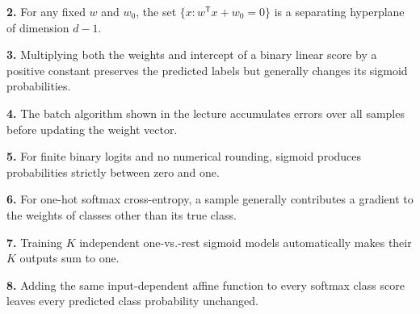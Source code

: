 \documentclass[11pt,a4paper]{article}
\begin{document}
\par\noindent\begin{minipage}{\linewidth}
\textbf{2.} For any fixed \(w\) and \(w_0\), the set \(\{x:w^{\mathsf T}x+w_0=0\}\) is a separating hyperplane of dimension \(d-1\).
\end{minipage}\par\vspace{3mm}
\par\noindent\begin{minipage}{\linewidth}
\textbf{3.} Multiplying both the weights and intercept of a binary linear score by a positive constant preserves the predicted labels but generally changes its sigmoid probabilities.
\end{minipage}\par\vspace{3mm}
\par\noindent\begin{minipage}{\linewidth}
\textbf{4.} The batch algorithm shown in the lecture accumulates errors over all samples before updating the weight vector.
\end{minipage}\par\vspace{3mm}
\par\noindent\begin{minipage}{\linewidth}
\textbf{5.} For finite binary logits and no numerical rounding, sigmoid produces probabilities strictly between zero and one.
\end{minipage}\par\vspace{3mm}
\par\noindent\begin{minipage}{\linewidth}
\textbf{6.} For one-hot softmax cross-entropy, a sample generally contributes a gradient to the weights of classes other than its true class.
\end{minipage}\par\vspace{3mm}
\par\noindent\begin{minipage}{\linewidth}
\textbf{7.} Training \(K\) independent one-vs.-rest sigmoid models automatically makes their \(K\) outputs sum to one.
\end{minipage}\par\vspace{3mm}
\par\noindent\begin{minipage}{\linewidth}
\textbf{8.} Adding the same input-dependent affine function to every softmax class score leaves every predicted class probability unchanged.
\end{minipage}\par\vspace{3mm}
\end{document}
